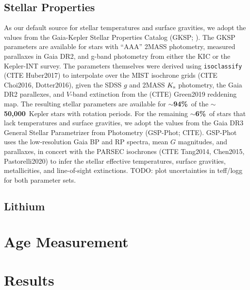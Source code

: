 \documentclass[12pt,twocolumn,tighten]{aastex63}
\newcommand{\nstarswithprot}{{\bf $\sim$50{,}000}}
\newcommand{\fracstarswithprotwithbtwenty}{{\bf $\sim$94\%}}
\newcommand{\fracstarswithprotwithoutbtwenty}{{\bf $\sim$6\%}}
\begin{document}
\subsection{Stellar Properties}


As our default source for stellar temperatures and surface gravities, we adopt
the values from the Gaia-Kepler Stellar Properties Catalog (GKSP;
\citealt{Berger_2020a_catalog}).
The GKSP parameters are available for stars with ``AAA'' 2MASS photometry,
measured parallaxes in Gaia DR2,  and g-band photometry from either the KIC or
the Kepler-INT survey.
The parameters themselves were derived using \texttt{isoclassify} (CITE
Huber2017) to interpolate over the MIST isochrone grids (CITE Choi2016,
Dotter2016), given the SDSS $g$ and 2MASS $K_{\rm s}$ photometry, the Gaia DR2
parallexes, and $V$-band extinction from the (CITE) Green2019 reddening map.
The resulting stellar parameters are available for
\fracstarswithprotwithbtwenty\ of the \nstarswithprot\ Kepler stars with
rotation periods.
For the remaining \fracstarswithprotwithoutbtwenty\ of stars that lack
temperatures and surface gravities, we adopt the values 
from the Gaia DR3 General Stellar Parametrizer from Photometry (GSP-Phot; CITE).
GSP-Phot uses the low-resolution Gaia BP and RP spectra, mean $G$ magnitudes,
and parallaxes, in concert with the PARSEC isochrones (CITE Tang2014, Chen2015,
Pastorelli2020) to infer the stellar effective temperatures, surface gravities,
metallicities, and line-of-sight extinctions.
TODO: plot uncertainties in teff/logg for both parameter sets.


\subsection{Lithium}



\section{Age Measurement}
\label{sec:agemethod}


\section{Results}
\label{sec:results}
\end{document}

